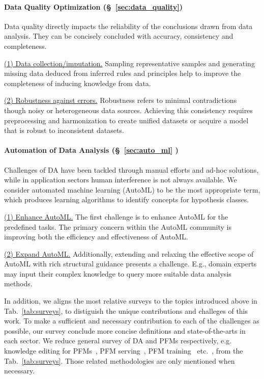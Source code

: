   \paragraph{\textbf{Data Quality Optimization (\S~\ref{sec:data_quality})}}  
  Data quality directly impacts the reliability of the conclusions drawn from data analysis. They can be concisely concluded with accuracy, consistency and completeness.
  
  \underline{(1) Data collection/imputation.} Sampling representative samples and generating missing data deduced from inferred rules and principles help to improve the completeness of inducing knowledge from data. 
  
  \underline{(2) Robustness against errors.} Robustness refers to minimal contradictions though noisy or heterogeneous data sources. Achieving this consistency requires preprocessing and harmonization to create unified datasets or acquire a model that is robust to inconsistent datasets.

  
  \paragraph{\textbf{Automation of Data Analysis (\S~\ref{sec:auto_ml}
  )}} Challenges of DA have been tackled through manual efforts and ad-hoc solutions, while in application sectors human interference is not always available. We consider automated machine learning (AutoML) to be the most appropriate term, which produces learning algorithms to identify concepts for hypothesis classes. 
  
  \underline{(1) Enhance AutoML.} The first challenge is to enhance AutoML for the predefined tasks. The primary concern within the AutoML community is improving both the efficiency and effectiveness of AutoML. 
  
  \underline{(2) Expand AutoML.} Additionally, extending and relaxing the effective scope of AutoML with rich structural guidance presents a challenge. E.g., domain experts may input their complex knowledge to query more suitable data analysis methods.
  

  
In addition, we aligns the most relative surveys to the topics introduced above in Tab.~\ref{tab:surveys}, to distiguish the unique contributions and challeges of this work. To make a sufficient and necessary contribution to each of the challenges as possible, our survey conclude more concise definitions and state-of-the-arts in each sector. We reduce general survey of DA and PFMs respectively, e.g. knowledge editing for PFMs~\cite{WangZLZCL25}, PFM serving~\cite{LiuZDZCZC24, ZhouCHCYZWZZ24, YangZDHLCXH25, MaoGFXMHG25, QuDSTZN25, WangCJPCYY25, WangGZYG25, FrihaFKCOG24, ChavanMKDG24, XuCYWJL25}, PFM training~\cite{LiuYFJHN23} etc.~\cite{Kumar24}, from the Tab.~\ref{tab:surveys}. Those related methodologies are only mentioned when necessary.
  
